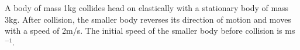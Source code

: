 \item A body of mass 1kg collides head on elastically with a stationary body of mass 3kg. After collision, the smaller body reverses its direction of motion and moves with a speed of 2m/s. The initial speed of the smaller body before collision is \underline{\hspace{2.5cm}} ms$^{-1}$.

    \begin{center}
    \end{center}